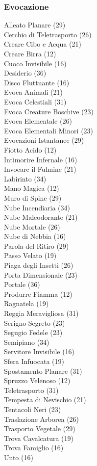 \begin{multicols}{3}
	\subsubsection{Evocazione}
	Alleato Planare (29)\\
	Cerchio di Teletrasporto (26)\\
	Creare Cibo e Acqua (21)\\
	Creare Birra (12)\\
	Cuoco Invisibile (16)\\
	Desiderio (36)\\
	Disco Fluttuante (16)\\
	Evoca Animali (21)\\
	Evoca Celestiali (31)\\
	Evoca Creature Boschive (23)\\
	Evoca Elementale (26)\\
	Evoca Elementali Minori (23)\\
	Evocazioni Istantanee (29)\\
	Fiotto Acido (12)\\
	Intimorire Infernale (16)\\
	Invocare il Fulmine (21)\\
	Labirinto (34)\\
	Mano Magica (12)\\
	Muro di Spine (29)\\
	Nube Incendiaria (34)\\
	Nube Maleodorante (21)\\
	Nube Mortale (26)\\
	Nube di Nebbia (16)\\
	Parola del Ritiro (29)\\
	Passo Velato (19)\\
	Piaga degli Insetti (26)\\
	Porta Dimensionale (23)\\
	Portale (36)\\
	Produrre Fiamma (12)\\
	Ragnatela (19)\\
	Reggia Meravigliosa (31)\\
	Scrigno Segreto (23)\\
	Segugio Fedele (23)\\
	Semipiano (34)\\
	Servitore Invisibile (16)\\
	Sfera Infuocata (19)\\
	Spostamento Planare (31)\\
	Spruzzo Velenoso (12)\\
	Teletrasporto (31)\\
	Tempesta di Nevischio (21)\\
	Tentacoli Neri (23)\\
	Traslazione Arborea (26)\\
	Trasporto Vegetale (29)\\
	Trova Cavalcatura (19)\\
	Trova Famiglio (16)\\
	Unto (16)\\
	

\end{multicols}
